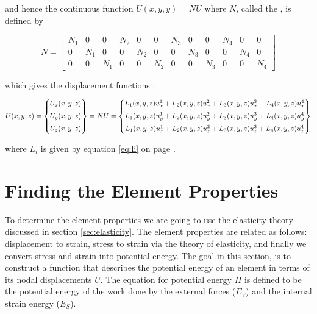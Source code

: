 and hence the continuous function $U(x,y,y) = N U$ where $N$, called the
, is defined by

\begin{equation}
\label{eq:interpolation_matrix}
N = \left[
\begin{array}{cccccccccccc}
N_1 & 0 & 0 & N_2 & 0 & 0 & N_3 & 0 & 0 & N_4 & 0 & 0 \\
0 & N_1 & 0 & 0 & N_2 & 0 & 0 & N_3 & 0 & 0 & N_4 & 0 \\
0 & 0 & N_1 & 0 & 0 & N_2 & 0 & 0 & N_3 & 0 & 0 & N_4
\end{array}
\right]
\end{equation}

which gives the displacement functions
:

\begin{equation}
U(x,y,z) =
\begin{Bmatrix}
U_x(x,y,z) 
\vspace{2mm} \\
U_y(x,y,z) 
\vspace{2mm} \\
U_z(x,y,z)
\end{Bmatrix}
= N U =
\begin{Bmatrix}
  L_1(x,y,z) u_x^{1} + L_2(x,y,z) u_x^{2}
  + L_3(x,y,z) u_x^{3} + L_4(x,y,z) u_x^{4}
\vspace{2mm}\\
  L_1(x,y,z) u_y^{1} + L_2(x,y,z) u_y^{2}
  + L_3(x,y,z) u_y^{3} + L_4(x,y,z) u_y^{4} 
\vspace{2mm}\\
  L_1(x,y,z) u_z^{1} + L_2(x,y,z) u_z^{2} 
  + L_3(x,y,z) u_z^{3} + L_4(x,y,z) u_z^{4}
\end{Bmatrix}
\end{equation}

where $L_i$ is given by equation \eqref{eq:li} on page \pageref{eq:li}.

\section{Finding the Element Properties}
%
To determine the element properties we are going to use the elasticity
theory discussed in section \vref{sec:elasticity}. The element
properties are related as follows:
displacement to strain, stress to strain via the theory of
elasticity, and finally we convert stress and strain into potential
energy. The goal in this section, is to construct a function
that describes the potential energy of an element in terms of its nodal
displacements $U$. The equation for potential energy $\Pi$ is defined
to be the potential energy of the work done by the external forces
($E_V$) and the internal strain energy ($E_S$).

